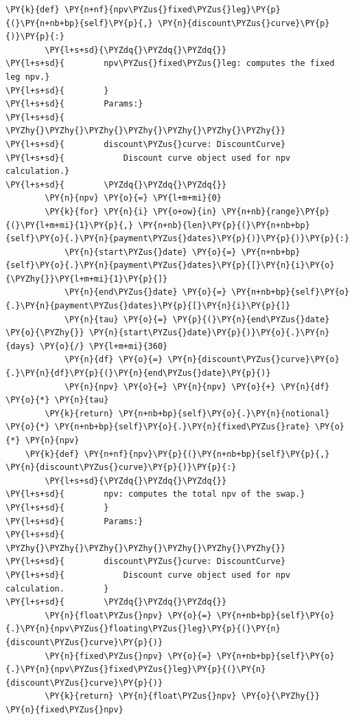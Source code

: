 \begin{tcolorbox}[breakable, size=fbox, boxrule=1pt, pad at break*=1mm,colback=cellbackground, colframe=cellborder]
\begin{Verbatim}[commandchars=\\\{\}]
    \PY{k}{def} \PY{n+nf}{npv\PYZus{}fixed\PYZus{}leg}\PY{p}{(}\PY{n+nb+bp}{self}\PY{p}{,} \PY{n}{discount\PYZus{}curve}\PY{p}{)}\PY{p}{:}
        \PY{l+s+sd}{\PYZdq{}\PYZdq{}\PYZdq{}}
\PY{l+s+sd}{        npv\PYZus{}fixed\PYZus{}leg: computes the fixed leg npv.}
\PY{l+s+sd}{        }
\PY{l+s+sd}{        Params:}
\PY{l+s+sd}{        \PYZhy{}\PYZhy{}\PYZhy{}\PYZhy{}\PYZhy{}\PYZhy{}\PYZhy{}}
\PY{l+s+sd}{        discount\PYZus{}curve: DiscountCurve}
\PY{l+s+sd}{            Discount curve object used for npv calculation.}
\PY{l+s+sd}{        \PYZdq{}\PYZdq{}\PYZdq{}}
        \PY{n}{npv} \PY{o}{=} \PY{l+m+mi}{0}
        \PY{k}{for} \PY{n}{i} \PY{o+ow}{in} \PY{n+nb}{range}\PY{p}{(}\PY{l+m+mi}{1}\PY{p}{,} \PY{n+nb}{len}\PY{p}{(}\PY{n+nb+bp}{self}\PY{o}{.}\PY{n}{payment\PYZus{}dates}\PY{p}{)}\PY{p}{)}\PY{p}{:}
            \PY{n}{start\PYZus{}date} \PY{o}{=} \PY{n+nb+bp}{self}\PY{o}{.}\PY{n}{payment\PYZus{}dates}\PY{p}{[}\PY{n}{i}\PY{o}{\PYZhy{}}\PY{l+m+mi}{1}\PY{p}{]}
            \PY{n}{end\PYZus{}date} \PY{o}{=} \PY{n+nb+bp}{self}\PY{o}{.}\PY{n}{payment\PYZus{}dates}\PY{p}{[}\PY{n}{i}\PY{p}{]}
            \PY{n}{tau} \PY{o}{=} \PY{p}{(}\PY{n}{end\PYZus{}date} \PY{o}{\PYZhy{}} \PY{n}{start\PYZus{}date}\PY{p}{)}\PY{o}{.}\PY{n}{days} \PY{o}{/} \PY{l+m+mi}{360}
            \PY{n}{df} \PY{o}{=} \PY{n}{discount\PYZus{}curve}\PY{o}{.}\PY{n}{df}\PY{p}{(}\PY{n}{end\PYZus{}date}\PY{p}{)}
            \PY{n}{npv} \PY{o}{=} \PY{n}{npv} \PY{o}{+} \PY{n}{df} \PY{o}{*} \PY{n}{tau}
        \PY{k}{return} \PY{n+nb+bp}{self}\PY{o}{.}\PY{n}{notional} \PY{o}{*} \PY{n+nb+bp}{self}\PY{o}{.}\PY{n}{fixed\PYZus{}rate} \PY{o}{*} \PY{n}{npv}
    \PY{k}{def} \PY{n+nf}{npv}\PY{p}{(}\PY{n+nb+bp}{self}\PY{p}{,} \PY{n}{discount\PYZus{}curve}\PY{p}{)}\PY{p}{:}
        \PY{l+s+sd}{\PYZdq{}\PYZdq{}\PYZdq{}}
\PY{l+s+sd}{        npv: computes the total npv of the swap.}
\PY{l+s+sd}{        }
\PY{l+s+sd}{        Params:}
\PY{l+s+sd}{        \PYZhy{}\PYZhy{}\PYZhy{}\PYZhy{}\PYZhy{}\PYZhy{}\PYZhy{}}
\PY{l+s+sd}{        discount\PYZus{}curve: DiscountCurve}
\PY{l+s+sd}{            Discount curve object used for npv calculation.        }
\PY{l+s+sd}{        \PYZdq{}\PYZdq{}\PYZdq{}}
        \PY{n}{float\PYZus{}npv} \PY{o}{=} \PY{n+nb+bp}{self}\PY{o}{.}\PY{n}{npv\PYZus{}floating\PYZus{}leg}\PY{p}{(}\PY{n}{discount\PYZus{}curve}\PY{p}{)}
        \PY{n}{fixed\PYZus{}npv} \PY{o}{=} \PY{n+nb+bp}{self}\PY{o}{.}\PY{n}{npv\PYZus{}fixed\PYZus{}leg}\PY{p}{(}\PY{n}{discount\PYZus{}curve}\PY{p}{)}
        \PY{k}{return} \PY{n}{float\PYZus{}npv} \PY{o}{\PYZhy{}} \PY{n}{fixed\PYZus{}npv}
\end{Verbatim}
\end{tcolorbox}

